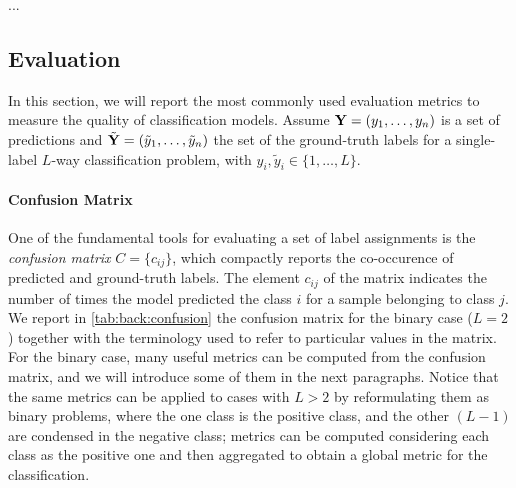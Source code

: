 ...
\subsection{Evaluation}
\label{subsec:back:classif-eval}

In this section, we will report the most commonly used evaluation metrics to measure the quality of classification models.
Assume $\mathbf{Y} = (y_1, \ldots, y_n)$ is a set of predictions and $\tilde{\mathbf{Y}} = (\tilde{y}_1, \ldots, \tilde{y}_n)$ the set of the ground-truth labels for a single-label $L$-way classification problem, with $y_i, \tilde{y}_i \in \{1, \ldots, L\}$. %

\paragraph{Confusion Matrix}
One of the fundamental tools for evaluating a set of label assignments is the \emph{confusion matrix} $C = \{c_{ij}\}$, which compactly reports the co-occurence of predicted and ground-truth labels.
The element $c_{ij}$ of the matrix indicates the number of times the model predicted the class $i$ for a sample belonging to class $j$.
We report in \ref{tab:back:confusion} the confusion matrix for the binary case ($L=2$) together with the terminology used to refer to particular values in the matrix.
For the binary case, many useful metrics can be computed from the confusion matrix, and we will introduce some of them in the next paragraphs.
Notice that the same metrics can be applied to cases with $L > 2$ by reformulating them as binary problems, where the one class is the positive class, and the other $(L-1)$ are condensed in the negative class;
metrics can be computed considering each class as the positive one and then aggregated to obtain a global metric for the classification.

